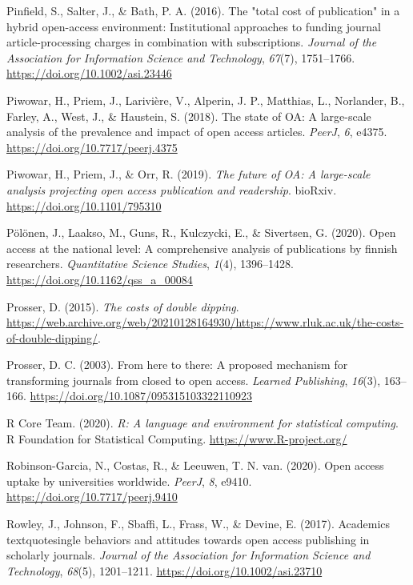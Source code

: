 \documentclass[a4paper,man,floatsintext,longtable,noextraspace,12pt]{apa6}
\newlength{\cslhangindent}
\newenvironment{cslreferences}%
  {\setlength{\parindent}{0pt}%
  \everypar{\setlength{\hangindent}{\cslhangindent}}\ignorespaces}%
  {\par}
\begin{document}
\begin{cslreferences}
\leavevmode\hypertarget{ref-Pinfield_2016}{}%
Pinfield, S., Salter, J., \& Bath, P. A. (2016). The "total cost of
publication" in a hybrid open-access environment: Institutional
approaches to funding journal article-processing charges in combination
with subscriptions. \emph{Journal of the Association for Information
Science and Technology}, \emph{67}(7), 1751--1766.
\url{https://doi.org/10.1002/asi.23446}

\leavevmode\hypertarget{ref-Piwowar_2018}{}%
Piwowar, H., Priem, J., Larivière, V., Alperin, J. P., Matthias, L.,
Norlander, B., Farley, A., West, J., \& Haustein, S. (2018). The state
of OA: A large-scale analysis of the prevalence and impact of open
access articles. \emph{PeerJ}, \emph{6}, e4375.
\url{https://doi.org/10.7717/peerj.4375}

\leavevmode\hypertarget{ref-Piwowar_2019}{}%
Piwowar, H., Priem, J., \& Orr, R. (2019). \emph{The future of OA: A
large-scale analysis projecting open access publication and readership}.
bioRxiv. \url{https://doi.org/10.1101/795310}

\leavevmode\hypertarget{ref-P_l_nen_2020}{}%
Pölönen, J., Laakso, M., Guns, R., Kulczycki, E., \& Sivertsen, G.
(2020). Open access at the national level: A comprehensive analysis of
publications by finnish researchers. \emph{Quantitative Science
Studies}, \emph{1}(4), 1396--1428.
\url{https://doi.org/10.1162/qss_a_00084}

\leavevmode\hypertarget{ref-Prosser_2015}{}%
Prosser, D. (2015). \emph{The costs of double dipping}.
\url{https://web.archive.org/web/20210128164930/https://www.rluk.ac.uk/the-costs-of-double-dipping/}.

\leavevmode\hypertarget{ref-Prosser_2003}{}%
Prosser, D. C. (2003). From here to there: A proposed mechanism for
transforming journals from closed to open access. \emph{Learned
Publishing}, \emph{16}(3), 163--166.
\url{https://doi.org/10.1087/095315103322110923}

\leavevmode\hypertarget{ref-r}{}%
R Core Team. (2020). \emph{R: A language and environment for statistical
computing}. R Foundation for Statistical Computing.
\url{https://www.R-project.org/}

\leavevmode\hypertarget{ref-Robinson_Garcia_2020}{}%
Robinson-Garcia, N., Costas, R., \& Leeuwen, T. N. van. (2020). Open
access uptake by universities worldwide. \emph{PeerJ}, \emph{8}, e9410.
\url{https://doi.org/10.7717/peerj.9410}

\leavevmode\hypertarget{ref-Rowley_2017}{}%
Rowley, J., Johnson, F., Sbaffi, L., Frass, W., \& Devine, E. (2017).
Academics\\
textquotesingle behaviors and attitudes towards open access publishing
in scholarly journals. \emph{Journal of the Association for Information
Science and Technology}, \emph{68}(5), 1201--1211.
\url{https://doi.org/10.1002/asi.23710}


\end{cslreferences}
\end{document}
